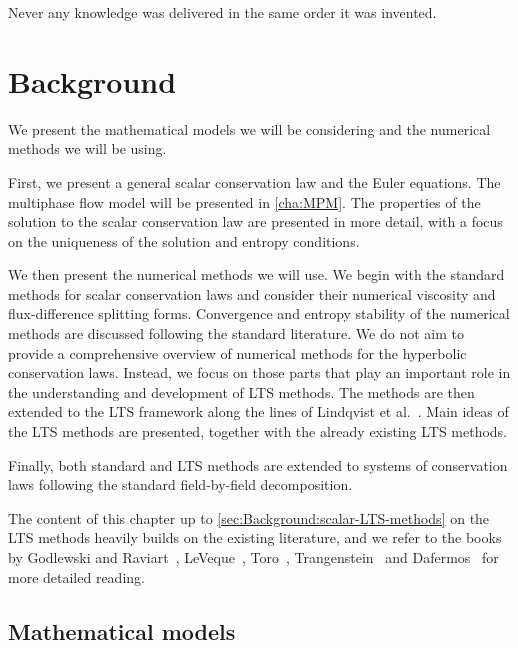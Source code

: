 
\begin{savequote}[50mm]
Never any knowledge was delivered in the same order it was invented.
\end{savequote}

\chapter{Background}
\label{cha:Background}


We present the mathematical models we will be considering and the numerical methods we will be using. 

First, we present a general scalar conservation law and the Euler equations. The multiphase flow model will be presented in \cref{cha:MPM}. The properties of the solution to the scalar conservation law are presented in more detail, with a focus on the uniqueness of the solution and entropy conditions.

We then present the numerical methods we will use. We begin with the standard methods for scalar conservation laws and consider their numerical viscosity and flux-difference splitting forms. Convergence and entropy stability of the numerical methods are discussed following the standard literature. We do not aim to provide a comprehensive overview of numerical methods for the hyperbolic conservation laws. Instead, we focus on those parts that play an important role in the understanding and development of LTS methods. The methods are then extended to the LTS framework along the lines of Lindqvist et al.~\cite{lin16}. Main ideas of the LTS methods are presented, together with the already existing LTS methods. 

Finally, both standard and LTS methods are extended to systems of conservation laws following the standard field-by-field decomposition.

The content of this chapter up to \cref{sec:Background:scalar-LTS-methods} on the LTS methods heavily builds on the existing literature, and we refer to the books by Godlewski and Raviart~\cite{god96}, LeVeque~\cite{lev92,lev02}, Toro~\cite{tor09}, Trangenstein~\cite{tra09} and Dafermos~\cite{daf10} for more detailed reading.

\section{Mathematical models}

